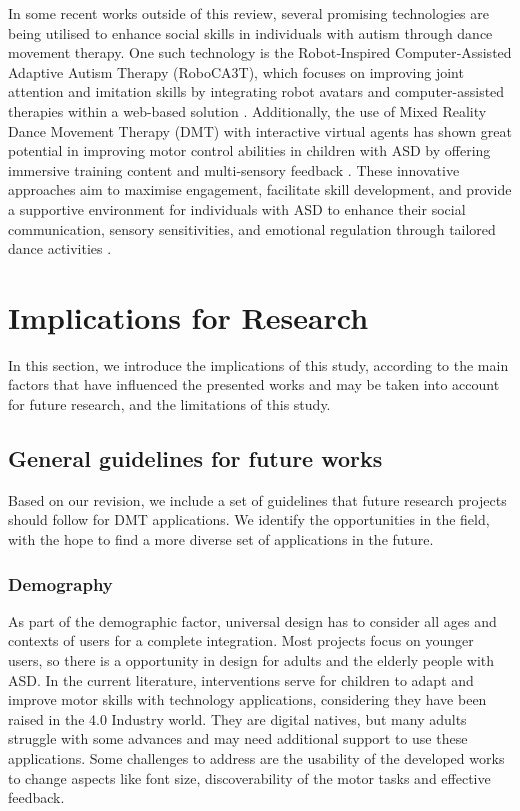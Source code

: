 \documentclass[a4paper,fleqn]{cas-sc}
\begin{document}
In some recent works outside of this review, several promising technologies are being utilised to enhance social skills in individuals with autism through dance movement therapy. One such technology is the Robot‐Inspired Computer‐Assisted Adaptive Autism Therapy (RoboCA3T), which focuses on improving joint attention and imitation skills by integrating robot avatars and computer-assisted therapies within a web-based solution \cite{Zahid24}. Additionally, the use of Mixed Reality Dance Movement Therapy (DMT) with interactive virtual agents has shown great potential in improving motor control abilities in children with ASD by offering immersive training content and multi-sensory feedback \cite{Liu24}. These innovative approaches aim to maximise engagement, facilitate skill development, and provide a supportive environment for individuals with ASD to enhance their social communication, sensory sensitivities, and emotional regulation through tailored dance activities \cite{Makheti24}.


\section{Implications for Research}
\label{sec6:implications}
In this section, we introduce the implications of this study, according to the main factors that have influenced the presented works and may be taken into account for future research, and the limitations of this study.

\subsection{General guidelines for future works}
Based on our revision, we include a set of guidelines that future research projects should follow for DMT applications. We identify the opportunities in the field, with the hope to find a more diverse set of applications in the future.

\subsubsection{Demography}

As part of the demographic factor, universal design has to consider all ages and contexts of users for a complete integration. Most projects focus on younger users, so there is a opportunity in design for adults and the elderly people with ASD. In the current literature, interventions serve for children to adapt and improve motor skills with technology applications, considering they have been raised in the 4.0 Industry world. They are digital natives, but many adults struggle with some advances and may need additional support to use these applications. Some challenges to address are the usability of the developed works to change aspects like font size, discoverability of the motor tasks and effective feedback.
\end{document}
